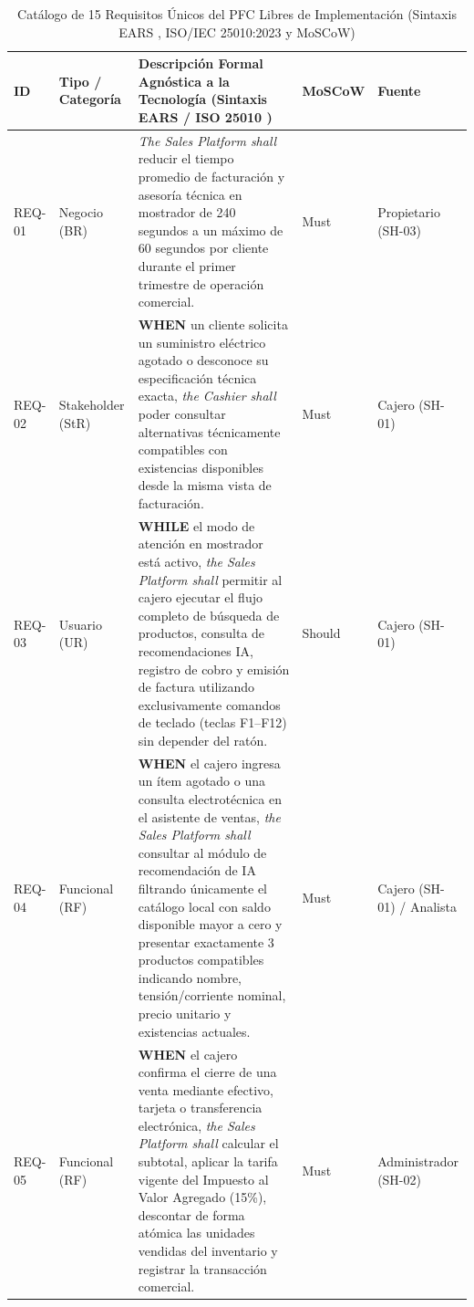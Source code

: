 \begin{table}[htbp]
	\centering
	\scriptsize
	\caption{Catálogo de 15 Requisitos Únicos del PFC Libres de Implementación (Sintaxis EARS \cite{mavin2009ears}, ISO/IEC 25010:2023 \cite{iso25010} y MoSCoW)}
	\label{tab:requisitos_pfc}
	\begin{tabularx}{\textwidth}{l >{\raggedright\arraybackslash}p{} Y l >{\raggedright\arraybackslash}p{0.08\textwidth}}
		\toprule
		\textbf{ID} & \textbf{Tipo / Categoría} & \textbf{Descripción Formal Agnóstica a la Tecnología (Sintaxis EARS \cite{mavin2009ears} / ISO 25010 \cite{iso25010})} & \textbf{MoSCoW} & \textbf{Fuente} \\
		\midrule
		REQ-01 & Negocio (BR) & \textit{The Sales Platform shall} reducir el tiempo promedio de facturación y asesoría técnica en mostrador de 240 segundos a un máximo de 60 segundos por cliente durante el primer trimestre de operación comercial. & Must & Propietario (SH-03) \\
		\midrule
		REQ-02 & Stakeholder (StR) & \textbf{WHEN} un cliente solicita un suministro eléctrico agotado o desconoce su especificación técnica exacta, \textit{the Cashier shall} poder consultar alternativas técnicamente compatibles con existencias disponibles desde la misma vista de facturación. & Must & Cajero (SH-01) \\
		\midrule
		REQ-03 & Usuario (UR) & \textbf{WHILE} el modo de atención en mostrador está activo, \textit{the Sales Platform shall} permitir al cajero ejecutar el flujo completo de búsqueda de productos, consulta de recomendaciones IA, registro de cobro y emisión de factura utilizando exclusivamente comandos de teclado (teclas F1--F12) sin depender del ratón. & Should & Cajero (SH-01) \\
		\midrule
		REQ-04 & Funcional (RF) & \textbf{WHEN} el cajero ingresa un ítem agotado o una consulta electrotécnica en el asistente de ventas, \textit{the Sales Platform shall} consultar al módulo de recomendación de IA filtrando únicamente el catálogo local con saldo disponible mayor a cero y presentar exactamente 3 productos compatibles indicando nombre, tensión/corriente nominal, precio unitario y existencias actuales. & Must & Cajero (SH-01) / Analista \\
		\midrule
		REQ-05 & Funcional (RF) & \textbf{WHEN} el cajero confirma el cierre de una venta mediante efectivo, tarjeta o transferencia electrónica, \textit{the Sales Platform shall} calcular el subtotal, aplicar la tarifa vigente del Impuesto al Valor Agregado (15\%), descontar de forma atómica las unidades vendidas del inventario y registrar la transacción comercial. & Must & Administrador (SH-02) \\

\end{tabularx}
\end{table}
